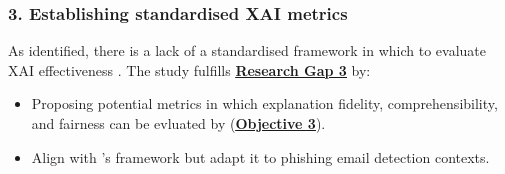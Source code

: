 
\subsubsection*{3. Establishing standardised XAI metrics}
As identified, there is a lack of a standardised framework in which to evaluate XAI effectiveness \citep{reddy2023explainable}. The study fulfills \hyperref[research-gap-3]{\uline{\textbf{Research Gap 3}}} by:

\begin{itemize}
  \item Proposing potential metrics in which explanation fidelity, comprehensibility, and fairness can be evluated by (\hyperref[objective-3]{\uline{\textbf{Objective 3}}}).
  \item Align with \cite{shendkar2024enhancing}'s framework but adapt it to phishing email detection contexts.
\end{itemize}

